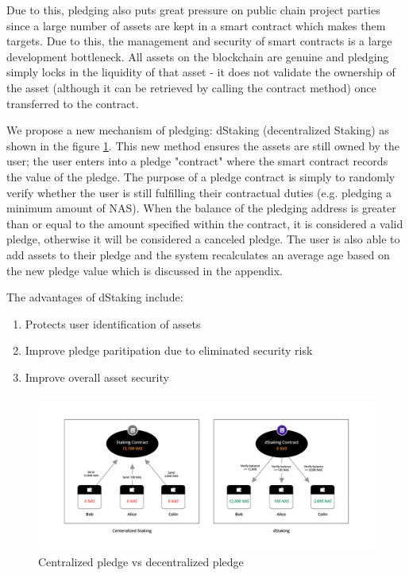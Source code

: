 Due to this, pledging also puts great pressure on public chain project parties since a large number of assets are kept in a smart contract which makes them targets. Due to this, the management and security of smart contracts is a large development bottleneck. All assets on the blockchain are genuine and pledging simply locks in the liquidity of that asset - it does not validate the ownership of the asset (although it can be retrieved by calling the contract method) once transferred to the contract.

We propose a new mechanism of pledging: dStaking (decentralized Staking) as shown in the figure \ref{fig:dStaking}. This new method ensures the assets are still owned by the user; the user enters into a pledge "contract" where the smart contract records the value of the pledge. The purpose of a pledge contract is simply to randomly verify whether the user is still fulfilling their contractual duties (e.g. pledging a minimum amount of NAS). When the balance of the pledging address is greater than or equal to the amount specified within the contract, it is considered a valid pledge, otherwise it will be considered a canceled pledge. The user is also able to add assets to their pledge and the system recalculates an average age based on the new pledge value which is discussed in the appendix.

The advantages of dStaking include:
\begin{enumerate}[\hspace{2cm}(a)]
    \item Protects user identification of assets
    \item Improve pledge paritipation due to eliminated security risk
    \item Improve overall asset security
\end{enumerate}

\begin{figure}[htbp]
  \centering
  \includegraphics[width=1\textwidth]{../common/dStaking.pdf}
  \caption{Centralized pledge vs decentralized pledge\label{fig:dStaking}}
\end{figure}

